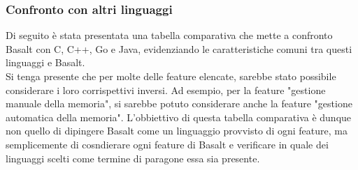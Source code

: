 \subsubsection{Confronto con altri linguaggi}
Di seguito è stata presentata una tabella comparativa che mette a confronto Basalt con C, C++, Go e Java, evidenziando 
le caratteristiche comuni tra questi linguaggi e Basalt. \\

Si tenga presente che per molte delle feature elencate, sarebbe stato possibile considerare i loro corrispettivi inversi. Ad
esempio, per la feature "gestione manuale della memoria", si sarebbe potuto considerare anche la feature "gestione automatica della memoria". L'obbiettivo
di questa tabella comparativa è dunque non quello di dipingere Basalt come un linguaggio provvisto di ogni feature, ma semplicemente di cosndierare ogni feature di 
Basalt e verificare in quale dei linguaggi scelti come termine di paragone essa sia presente. \\

